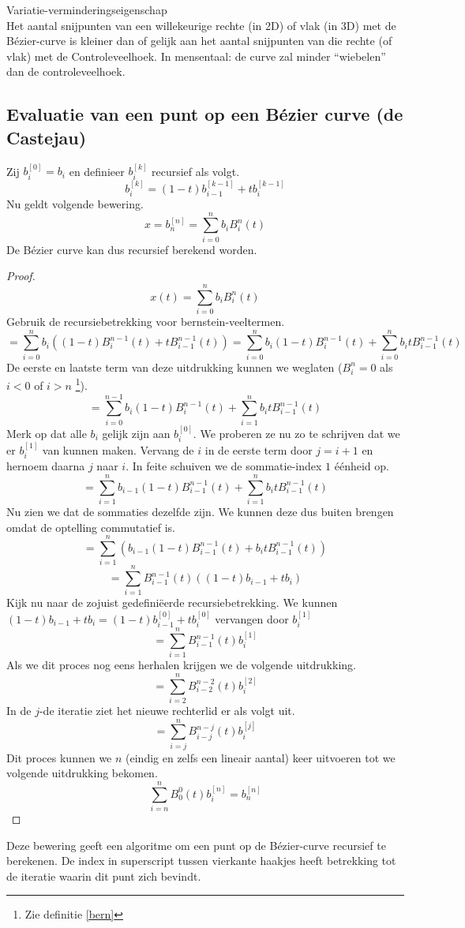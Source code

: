 \documentclass[computergesteund_ontwerp_van_curven_en_oppervlakken.tex]{subfiles}
\begin{document}
\begin{ei}
Variatie-verminderingseigenschap\\
Het aantal snijpunten van een willekeurige rechte (in 2D) of vlak (in 3D) met de B\'ezier-curve is kleiner dan of gelijk aan het aantal snijpunten van die rechte (of vlak) met de Controleveelhoek. In mensentaal: de curve zal minder ``wiebelen'' dan de controleveelhoek.
\end{ei}

\subsection{Evaluatie van een punt op een B\'ezier curve (de Castejau)}
\label{de_casteljau}
\begin{st}
Zij $b_{i}^{[0]} = b_{i}$ en definieer $b_{i}^{[k]}$ recursief als volgt.
\[
b_{i}^{[k]}
=
(1-t)b_{i-1}^{[k-1]} + tb_{i}^{[k-1]}
\]
Nu geldt volgende bewering.
\[
x = b_{n}^{[n]} = \sum_{i=0}^{n}b_iB_{i}^{n}(t)
\]
De B\'ezier curve kan dus recursief berekend worden.
\begin{proof}
\[
x(t) = \sum_{i=0}^{n}b_iB_{i}^{n}(t)
\]
Gebruik de recursiebetrekking voor bernstein-veeltermen.
\[
= \sum_{i=0}^{n}b_i
\left( 
(1-t)B^{n-1}_{i}(t) + tB^{n-1}_{i-1}(t)
\right)
= 
\sum_{i=0}^{n}b_i
(1-t)B^{n-1}_{i}(t) + 
\sum_{i=0}^{n}b_it
B^{n-1}_{i-1}(t)
\]
De eerste en laatste term van deze uitdrukking kunnen we weglaten ($B_{i}^{n} = 0$ als $i < 0$ of $i > n$ \footnote{Zie definitie \ref{bern}}).
\[
= 
\sum_{i=0}^{n-1}b_i
(1-t)B^{n-1}_{i}(t) + 
\sum_{i=1}^{n}b_it
B^{n-1}_{i-1}(t)
\]
Merk op dat alle $b_i$ gelijk zijn aan $b_i^{[0]}$. We proberen ze nu zo te schrijven dat we er $b_i^{[1]}$ van kunnen maken. Vervang de $i$ in de eerste term door $j=i+1$ en hernoem daarna $j$ naar $i$. In feite schuiven we de sommatie-index $1$ \'e\'enheid op.
\[
= 
\sum_{i=1}^{n}b_{i-1}
(1-t)B^{n-1}_{i-1}(t) + 
\sum_{i=1}^{n}b_it
B^{n-1}_{i-1}(t)
\]
Nu zien we dat de sommaties dezelfde zijn. We kunnen deze dus buiten brengen omdat de optelling commutatief is.
\[
= 
\sum_{i=1}^{n}
\left(
b_{i-1}(1-t)B^{n-1}_{i-1}(t)
+ 
b_itB^{n-1}_{i-1}(t)
\right)
\]
\[
= 
\sum_{i=1}^{n}
B^{n-1}_{i-1}(t)
\left(
(1-t)b_{i-1}
+ 
tb_i
\right)
\]
Kijk nu naar de zojuist gedefini\"eerde recursiebetrekking. We kunnen $(1-t)b_{i-1} + tb_i = (1-t)b_{i-1}^{[0]} + tb_i^{[0]}$ vervangen door $b_{i}^{[1]}$
\[
= 
\sum_{i=1}^{n}
B^{n-1}_{i-1}(t)
b_{i}^{[1]}
\]
Als we dit proces nog eens herhalen krijgen we de volgende uitdrukking.
\[
= 
\sum_{i=2}^{n}
B^{n-2}_{i-2}(t)
b_{i}^{[2]}
\]
In de $j$-de iteratie ziet het nieuwe rechterlid er als volgt uit.
\[
= 
\sum_{i=j}^{n}
B^{n-j}_{i-j}(t)
b_{i}^{[j]}
\]
Dit proces kunnen we $n$ (eindig en zelfs een lineair aantal) keer uitvoeren tot we volgende uitdrukking bekomen.
\[
\sum_{i=n}^{n}
B^{0}_{0}(t)
b_{i}^{[n]}
= b_{n}^{[n]}
\]
\end{proof}
\end{st}
Deze bewering geeft een algoritme om een punt op de B\'ezier-curve recursief te berekenen. De index in superscript tussen vierkante haakjes heeft betrekking tot de iteratie waarin dit punt zich bevindt.
\end{document}
